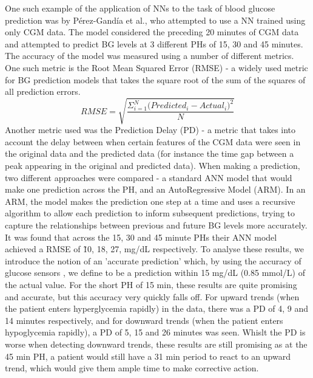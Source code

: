       One such example of the application of NNs to the task of blood glucose prediction was by Pérez-Gandía et al.\cite{paper3}, who attempted to use a NN trained using only CGM data. The model considered the preceding 20 minutes of CGM data and attempted to predict BG levels at 3 different PHs of 15, 30 and 45 minutes. The accuracy of the model was measured using a number of different metrics. One such metric is the Root Mean Squared Error (RMSE) - a widely used metric for BG prediction models that takes the square root of the sum of the squares of all prediction errors.
      \[RMSE = \sqrt{\frac{\Sigma_{i=1}^{N}{\Big(Predicted_i - Actual_i\Big)^2}}{N}}\]
      Another metric used was the Prediction Delay (PD) - a metric that takes into account the delay between when certain features of the CGM data were seen in the original data and the predicted data (for instance the time gap between a peak appearing in the original and predicted data). When making a prediction, two different approaches were compared - a standard ANN model that would make one prediction across the PH, and an AutoRegressive Model (ARM). In an ARM, the model makes the prediction one step at a time and uses a recursive algorithm to allow each prediction to inform subsequent predictions, trying to capture the relationships between previous and future BG levels more accurately. It was found that across the 15, 30 and 45 minute PHs their ANN model achieved a RMSE of \~10, 18, 27, mg/dL respectively. To analyse these results, we introduce the notion of an 'accurate prediction' which, by using the accuracy of glucose sensors \cite{CGMacc}, we define to be a prediction within 15 mg/dL (0.85 mmol/L) of the actual value.  For the short PH of 15 min, these results are quite promising and accurate, but this accuracy very quickly falls off. For upward trends (when the patient enters hyperglycemia rapidly) in the data, there was a PD of 4, 9 and 14 minutes respectively, and for downward trends (when the patient enters hypoglycemia rapidly), a PD of 5, 15 and 26 minutes was seen. Whislt the PD is worse when detecting downward trends, these results are still promising as at the 45 min PH, a patient would still have a 31 min period to react to an upward trend, which would give them ample time to make corrective action.

